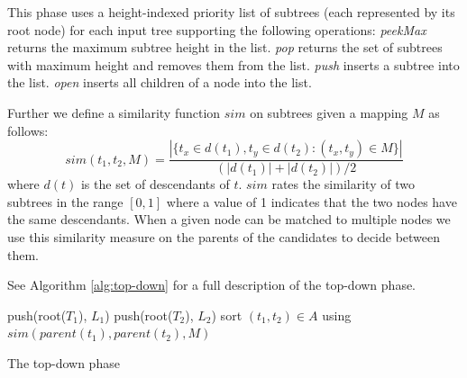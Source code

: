 \documentclass[letterpaper]{article}
\begin{document}
This phase uses a height-indexed priority list of subtrees (each represented by its root node) for each input tree supporting the following operations:
\emph{peekMax} returns the maximum subtree height in the list.
\emph{pop} returns the set of subtrees with maximum height and removes them from the list.
\emph{push} inserts a subtree into the list.
\emph{open} inserts all children of a node into the list.

Further we define a similarity function $sim$ on subtrees given a mapping $M$ as follows:
$$ sim(t_1, t_2, M) = \frac{| \{ t_x \in d(t_1), t_y \in d(t_2) : (t_x, t_y) \in M \} | }{ (|d(t_1)| + |d(t_2)|) / 2} $$
where $d(t)$ is the set of descendants of $t$. $sim$ rates the similarity of two subtrees in the range $[0,1]$ where a value of 1 indicates that the two nodes have the same descendants.
When a given node can be matched to multiple nodes we use this similarity measure on the parents of the candidates to decide between them.

See Algorithm \ref{alg:top-down} for a full description of the top-down phase.

\SetAlFnt{\footnotesize}
\SetInd{0.3em}{0.6em}
\SetAlgoVlined

\begin{algorithm}
	push(root($T_1$), $L_1$)\;
	push(root($T_2$), $L_2$)\;
	sort $(t_1,t_2) \in A$ using $sim(parent(t_1),parent(t_2), M)$\;
\caption{The top-down phase}
\label{alg:top-down}
\end{algorithm}
\end{document}

